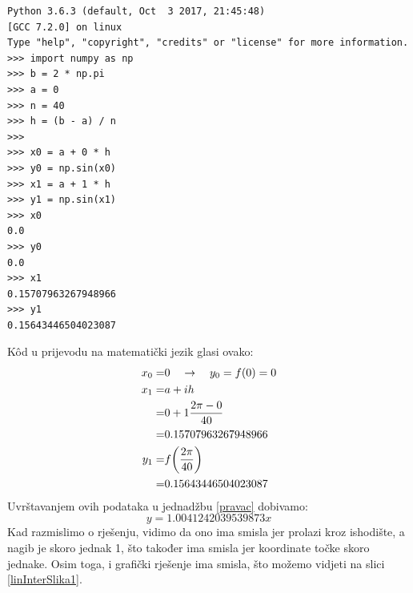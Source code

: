\documentclass[12pt,a4paper]{report}
\begin{document}
		\begin{lstlisting}
Python 3.6.3 (default, Oct  3 2017, 21:45:48) 
[GCC 7.2.0] on linux
Type "help", "copyright", "credits" or "license" for more information.
>>> import numpy as np
>>> b = 2 * np.pi
>>> a = 0
>>> n = 40
>>> h = (b - a) / n
>>> 
>>> x0 = a + 0 * h
>>> y0 = np.sin(x0)
>>> x1 = a + 1 * h
>>> y1 = np.sin(x1)
>>> x0
0.0
>>> y0
0.0
>>> x1
0.15707963267948966
>>> y1
0.15643446504023087
		\end{lstlisting}

		K\^{o}d u prijevodu na matematički jezik glasi ovako:
		\begin{align*}
			x_0=&0\quad\rightarrow \quad y_0=f(0)=0\\
			x_1=&a+ih\\=&0+1\frac{2\pi-0}{40}\\
				=&0.15707963267948966\\
			y_1=&f\biggr{(}\frac{2\pi}{40}\biggr{)}\\=&0.15643446504023087
		\end{align*}
		Uvrštavanjem ovih podataka u jednadžbu \ref{pravac} dobivamo:
		\begin{equation}
			y=1.0041242039539873x
			\label{linInt1}
		\end{equation}
		Kad razmislimo o rješenju, vidimo da ono ima smisla jer prolazi kroz ishodište, a nagib je skoro jednak 1, što također ima smisla jer koordinate točke skoro jednake. Osim toga, i grafički rješenje ima smisla, što možemo vidjeti na slici \ref{linInterSlika1}.
\end{document}
